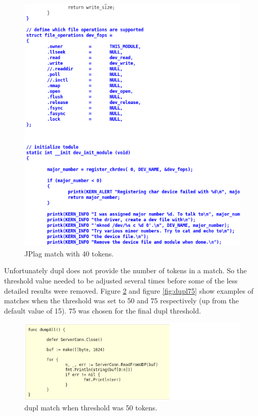 \documentclass[10pt,journal,compsoc]{IEEEtran}
\begin{document}
		\begin{figure}[h!]
			\includegraphics[width=1.0\textwidth]{jplag40.png}
			\caption{JPlag match with 40 tokens.}
			\label{fig:jplag40}
		\end{figure}
		
		Unfortunately dupl does not provide the number of tokens in a match. So the threshold value needed to be adjusted several times before some of the less detailed results were removed. Figure \ref{fig:dupl50} and figure \ref{fig:dupl75} show examples of matches when the threshold was set to 50 and 75 respectively (up from the default value of 15). 75 was chosen for the final dupl threshold.
		
		\begin{figure}[h!]
			\includegraphics[width=1.0\textwidth]{dupl50.png}
			\caption{dupl match when threshold was 50 tokens.}
			\label{fig:dupl50}
		\end{figure}
		
\end{document}
